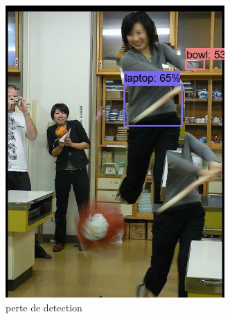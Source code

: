 \documentclass[12pt, letterpaper]{article}
\begin{document}
\begin{figure}[H]
\begin{subfigure}[b]{0.4\linewidth}
      \includegraphics[width=\linewidth]{img/fig18.png}
      \caption{perte de detection}
    \end{subfigure}
    \begin{subfigure}[b]{0.4\linewidth}

\end{subfigure}
\end{figure}
\end{document}
